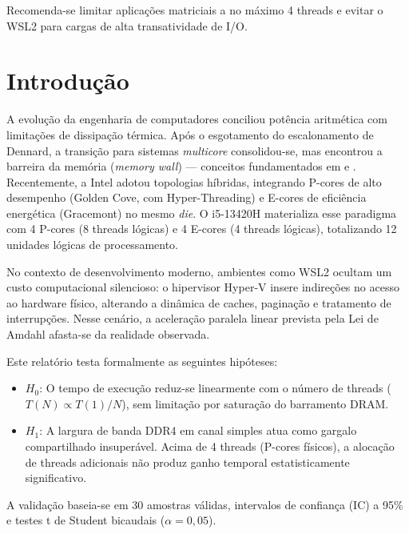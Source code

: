 \documentclass[
	12pt,
	openright,
	oneside,
	a4paper,
	english,
	brazil
	]{abntex2}
\begin{document}
Recomenda-se limitar aplicações matriciais a no máximo 4 threads e evitar o WSL2 para cargas de alta transatividade de I/O.

\chapter{Introdução}
\label{chap:introducao}

A evolução da engenharia de computadores conciliou potência aritmética com limitações de dissipação térmica. Após o esgotamento do escalonamento de Dennard, a transição para sistemas \textit{multicore} consolidou-se, mas encontrou a barreira da memória (\textit{memory wall}) \cite{mccalpin1995} — conceitos fundamentados em  e . Recentemente, a Intel adotou topologias híbridas, integrando P-cores de alto desempenho (Golden Cove, com Hyper-Threading) e E-cores de eficiência energética (Gracemont) no mesmo \textit{die}. O i5-13420H materializa esse paradigma com 4 P-cores (8 threads lógicas) e 4 E-cores (4 threads lógicas), totalizando 12 unidades lógicas de processamento.

No contexto de desenvolvimento moderno, ambientes como WSL2 ocultam um custo computacional silencioso: o hipervisor Hyper-V insere indireções no acesso ao hardware físico, alterando a dinâmica de caches, paginação e tratamento de interrupções. Nesse cenário, a aceleração paralela linear prevista pela Lei de Amdahl \cite{amdahl1967} afasta-se da realidade observada.

Este relatório testa formalmente as seguintes hipóteses:

\begin{itemize}
    \item \textbf{$H_0$}: O tempo de execução reduz-se linearmente com o número de threads ($T(N) \propto T(1)/N$), sem limitação por saturação do barramento DRAM.
    \item \textbf{$H_1$}: A largura de banda DDR4 em canal simples atua como gargalo compartilhado insuperável. Acima de 4 threads (P-cores físicos), a alocação de threads adicionais não produz ganho temporal estatisticamente significativo.
\end{itemize}

A validação baseia-se em 30 amostras válidas, intervalos de confiança (IC) a 95\% e testes t de Student bicaudais ($\alpha = 0{,}05$).
\end{document}
